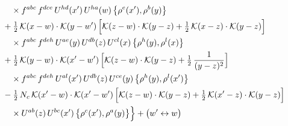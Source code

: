 \documentclass[10pt]{article}
\numberwithin{equation}{section}
\newcommand{\KK}{\mathcal K}
\begin{document}
\begin{align}
&\qquad\times f^{abc}\,f^{dce}\,U^{hd}(x')\,U^{ha}(w)\,\big\{\rho^{e}(x'),\rho^{b}(y)\big\}\notag\\
&\quad +\tfrac12\,\KK(x-w)\cdot\KK(y-w')\,\Big[\KK(z-w)\cdot\KK(y-z)+\tfrac12\,\KK(x-z)\cdot\KK(y-z)\Big]\notag\\
&\qquad\times f^{abc}\,f^{deh}\,U^{ae}(y)\,U^{db}(z)\,U^{cl}(x)\,\big\{\rho^{h}(y),\rho^{l}(x)\big\}\notag\\
&\quad +\tfrac12\,\KK(y-w)\cdot\KK(x'-w')\,\Big[\KK(z-w)\cdot\KK(y-z)+\tfrac12\,\frac{1}{(y-z)^2}\Big]\notag\\
&\qquad\times f^{abc}\,f^{deh}\,U^{al}(x')\,U^{db}(z)\,U^{ce}(y)\,\big\{\rho^{h}(y),\rho^{l}(x')\big\}\notag\\
&\quad -\tfrac12\,N_{c}\,\KK(x'-w)\cdot\KK(x'-w')\,\Big[\KK(z-w)\cdot\KK(y-z)+\tfrac12\,\KK(x'-z)\cdot\KK(y-z)\Big]\notag\\
&\qquad\times U^{ab}(z)\,U^{bc}(x')\,\big\{\rho^{c}(x'),\rho^{a}(y)\big\}\Big\}+\big(w'\leftrightarrow w\big)\label{R:eq:sum-GIII.II}
\end{align}
\end{document}
